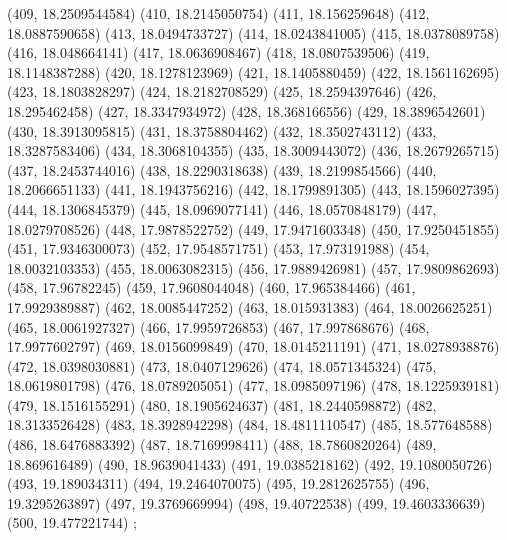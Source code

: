 {					(409, 18.2509544584)
					(410, 18.2145050754)
					(411, 18.156259648)
					(412, 18.0887590658)
					(413, 18.0494733727)
					(414, 18.0243841005)
					(415, 18.0378089758)
					(416, 18.048664141)
					(417, 18.0636908467)
					(418, 18.0807539506)
					(419, 18.1148387288)
					(420, 18.1278123969)
					(421, 18.1405880459)
					(422, 18.1561162695)
					(423, 18.1803828297)
					(424, 18.2182708529)
					(425, 18.2594397646)
					(426, 18.295462458)
					(427, 18.3347934972)
					(428, 18.368166556)
					(429, 18.3896542601)
					(430, 18.3913095815)
					(431, 18.3758804462)
					(432, 18.3502743112)
					(433, 18.3287583406)
					(434, 18.3068104355)
					(435, 18.3009443072)
					(436, 18.2679265715)
					(437, 18.2453744016)
					(438, 18.2290318638)
					(439, 18.2199854566)
					(440, 18.2066651133)
					(441, 18.1943756216)
					(442, 18.1799891305)
					(443, 18.1596027395)
					(444, 18.1306845379)
					(445, 18.0969077141)
					(446, 18.0570848179)
					(447, 18.0279708526)
					(448, 17.9878522752)
					(449, 17.9471603348)
					(450, 17.9250451855)
					(451, 17.9346300073)
					(452, 17.9548571751)
					(453, 17.973191988)
					(454, 18.0032103353)
					(455, 18.0063082315)
					(456, 17.9889426981)
					(457, 17.9809862693)
					(458, 17.96782245)
					(459, 17.9608044048)
					(460, 17.965384466)
					(461, 17.9929389887)
					(462, 18.0085447252)
					(463, 18.015931383)
					(464, 18.0026625251)
					(465, 18.0061927327)
					(466, 17.9959726853)
					(467, 17.997868676)
					(468, 17.9977602797)
					(469, 18.0156099849)
					(470, 18.0145211191)
					(471, 18.0278938876)
					(472, 18.0398030881)
					(473, 18.0407129626)
					(474, 18.0571345324)
					(475, 18.0619801798)
					(476, 18.0789205051)
					(477, 18.0985097196)
					(478, 18.1225939181)
					(479, 18.1516155291)
					(480, 18.1905624637)
					(481, 18.2440598872)
					(482, 18.3133526428)
					(483, 18.3928942298)
					(484, 18.4811110547)
					(485, 18.577648588)
					(486, 18.6476883392)
					(487, 18.7169998411)
					(488, 18.7860820264)
					(489, 18.869616489)
					(490, 18.9639041433)
					(491, 19.0385218162)
					(492, 19.1080050726)
					(493, 19.189034311)
					(494, 19.2464070075)
					(495, 19.2812625755)
					(496, 19.3295263897)
					(497, 19.3769669994)
					(498, 19.40722538)
					(499, 19.4603336639)
					(500, 19.477221744)
				};
